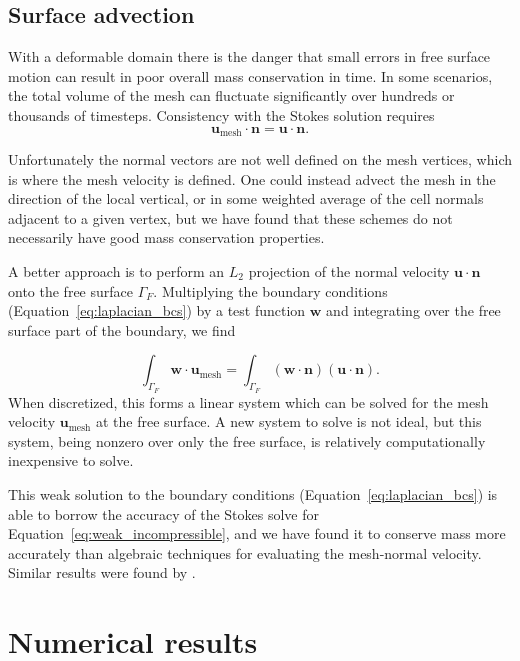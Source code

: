 \documentclass[preprint,12pt,authoryear]{elsarticle}
\begin{document}
\subsection{Surface advection}
With a deformable domain there is the danger that small errors in free surface motion can
result in poor overall mass conservation in time. In some scenarios, the total volume of the mesh can 
fluctuate significantly over hundreds or thousands of timesteps.
Consistency with the Stokes solution requires 
\begin{equation}
\mathbf{u}_{\mathrm{mesh}} \cdot \mathbf{n} = \mathbf{u \cdot n}.
\end{equation}

Unfortunately the normal vectors are not well defined on the mesh vertices, which is 
where the mesh velocity is defined. One could instead advect the mesh in the direction 
of the local vertical, or in some weighted average of the cell normals adjacent to a given vertex,
but we have found that these schemes do not necessarily have good mass conservation 
properties.

A better approach is to perform an $L_2$ projection of the normal velocity $\mathbf{u}\cdot\mathbf{n}$
onto the free surface $\Gamma_F$. Multiplying the boundary conditions 
(Equation~\eqref{eq:laplacian_bcs}) by a test function $\mathbf{w}$ and integrating over the free
surface part of the boundary, we find

\begin{equation}
\int_{\Gamma_F} \mathbf{w} \cdot \mathbf{u}_\mathrm{mesh} = 
\int_{\Gamma_F} \left( \mathbf{w \cdot n } \right) \left( \mathbf{u \cdot n} \right).
\end{equation}
When discretized, this forms a linear system which can be solved for the mesh velocity $\mathbf{u}_\mathrm{mesh}$ at the 
free surface. A new system to solve is not ideal, but this system, being nonzero 
over only the free surface, is relatively computationally inexpensive to solve.

This weak solution to the boundary conditions (Equation~\eqref{eq:laplacian_bcs}) is able to borrow
the accuracy of the Stokes solve for Equation~\eqref{eq:weak_incompressible}, and we have 
found it to conserve mass more accurately than algebraic techniques for evaluating the mesh-normal velocity.
Similar results were found by \citet{fullsack1995arbitrary}.

\section{Numerical results}
\label{sec:results}
\end{document}
